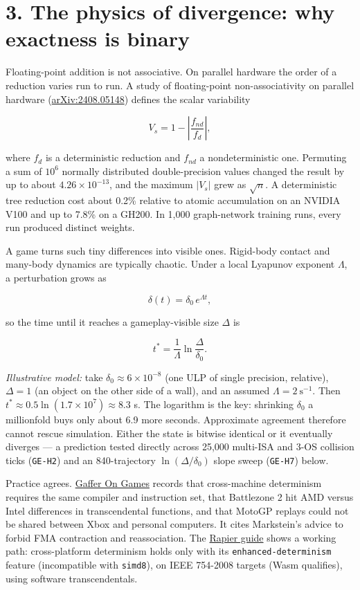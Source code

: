 \documentclass[10pt,letterpaper]{article}
\begin{document}
\section{3. The physics of divergence: why exactness is
binary}\label{the-physics-of-divergence-why-exactness-is-binary}

Floating-point addition is not associative. On parallel hardware the
order of a reduction varies run to run. A study of floating-point
non-associativity on parallel hardware
(\href{https://arxiv.org/abs/2408.05148}{arXiv:2408.05148}) defines the
scalar variability

\[V_s = 1 - \left| \frac{f_{nd}}{f_d} \right|,\]

where \(f_d\) is a deterministic reduction and \(f_{nd}\) a
nondeterministic one. Permuting a sum of \(10^6\) normally distributed
double-precision values changed the result by up to about
\(4.26 \times 10^{-13}\), and the maximum \(|V_s|\) grew as
\(\sqrt{n}\). A deterministic tree reduction cost about 0.2\% relative
to atomic accumulation on an NVIDIA V100 and up to 7.8\% on a GH200. In
1,000 graph-network training runs, every run produced distinct weights.

A game turns such tiny differences into visible ones. Rigid-body contact
and many-body dynamics are typically chaotic. Under a local Lyapunov
exponent \(\Lambda\), a perturbation grows as

\[\delta(t) = \delta_0 \, e^{\Lambda t},\]

so the time until it reaches a gameplay-visible size \(\Delta\) is

\[t^{*} = \frac{1}{\Lambda} \ln\frac{\Delta}{\delta_0}.\]

\emph{Illustrative model:} take \(\delta_0 \approx 6 \times 10^{-8}\)
(one ULP of single precision, relative), \(\Delta = 1\) (an object on
the other side of a wall), and an assumed
\(\Lambda = 2\ \text{s}^{-1}\). Then
\(t^{*} \approx 0.5 \ln(1.7 \times 10^{7}) \approx 8.3\) s. The
logarithm is the key: shrinking \(\delta_0\) a millionfold buys only
about 6.9 more seconds. Approximate agreement therefore cannot rescue
simulation. Either the state is bitwise identical or it eventually
diverges --- a prediction tested directly across 25,000 multi-ISA and
3-OS collision ticks (\texttt{GE-H2}) and an 840-trajectory
\(\ln(\Delta/\delta_0)\) slope sweep (\texttt{GE-H7}) below.

Practice agrees.
\href{https://gafferongames.com/post/floating_point_determinism/}{Gaffer
On Games} records that cross-machine determinism requires the same
compiler and instruction set, that Battlezone 2 hit AMD versus Intel
differences in transcendental functions, and that MotoGP replays could
not be shared between Xbox and personal computers. It cites Markstein's
advice to forbid FMA contraction and reassociation. The
\href{https://rapier.rs/docs/user_guides/rust/determinism/}{Rapier
guide} shows a working path: cross-platform determinism holds only with
its \texttt{enhanced-\allowbreak{}determinism} feature (incompatible with
\texttt{simd8}), on IEEE 754-2008 targets (Wasm qualifies), using
software transcendentals.
\end{document}

